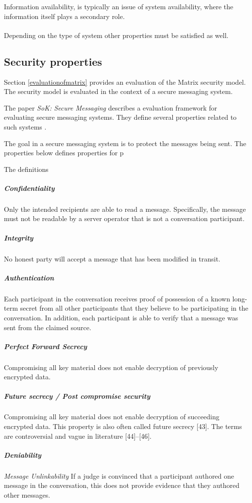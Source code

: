 Information availability, is typically an issue of system availability, where the information itself plays a secondary role.
\\
\\
Depending on the type of system other properties must be satisfied as well. 


\subsection{Security properties}
Section \ref{evaluationofmatrix} provides an evaluation of the Matrix security model. The security model is evaluated in the context of a secure messaging system.  

The paper \emph{SoK: Secure Messaging} describes a evaluation framework for evaluating secure messaging systems. They define several properties related to such systems \cite{sok}.


The goal in a secure messaging system is to protect the messages being sent. The properties below defines properties for p

The definitions 

\subparagraph{Confidentiality} Only the intended recipients are able to read a message. Specifically, the message must not be readable by a server operator that is not a conversation participant.

\subparagraph{Integrity} No honest party will accept a message that has been modified in transit.

\subparagraph{Authentication}
Each participant in the conversation receives proof of possession of a known long-term secret from all other participants that they believe to be participating in the conversation. In addition, each participant is able to verify that a message was sent from the claimed source.


\subparagraph{Perfect Forward Secrecy}
Compromising all key material does not enable decryption of previously encrypted data.

\subparagraph{Future secrecy / Post compromise security}
Compromising all key material does not enable decryption of succeeding encrypted data. This
property is also often called future secrecy [43]. The terms are controversial and vague in literature [44]–[46].

\subparagraph{Deniability}
\emph{Message Unlinkability} If a judge is convinced that a participant authored one message in the conversation, this does not provide evidence that they authored other messages.

